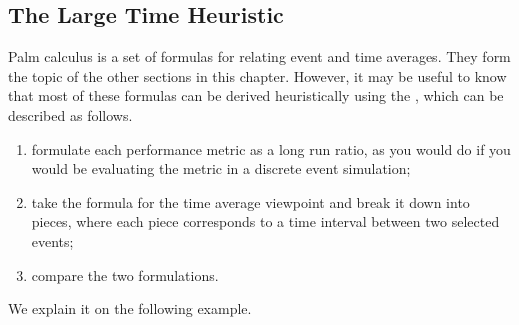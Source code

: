 \subsection{The Large Time Heuristic}
Palm calculus is a set of formulas for relating event and time
averages. They form the topic of the other sections in this chapter.
However, it may be useful to know that most of these formulas can be
derived heuristically using the , which can
be described as follows.
\begin{enumerate}
    \item formulate each performance metric as a long run ratio, as
    you would do if you would be evaluating the metric in a discrete event
    simulation;
    \item take the formula for the time average viewpoint and break it down into
    pieces, where each piece corresponds to a time interval between two selected
    events;
    \item compare the two formulations.
\end{enumerate}

We explain it on the following example.

